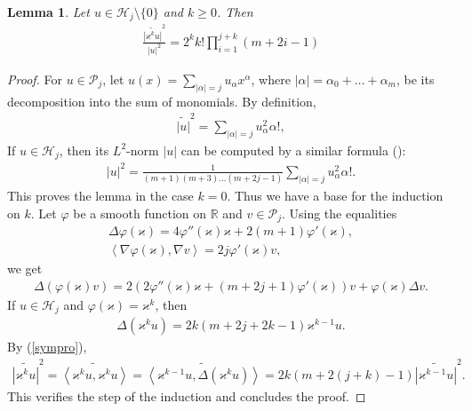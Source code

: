 \documentclass[10pt]{amsart}
\newtheorem{lemma}{Lemma}
\theoremstyle{remark}
\let\wtd=\widetilde
\begin{document}
\begin{lemma}\label{taukj}
Let $u\in{\mathcal{H}}_j\setminus\{0\}$ and $k\geq0$. Then
\begin{eqnarray*}
\frac{\wtd{|{{\mathord{\varkappa}}}^k u|}^2}{|u|^2}= 2^k
k!\prod_{i=1}^{j+k}(m+2i-1)
\end{eqnarray*}
\end{lemma}
\begin{proof}
For $u\in{\mathcal{P}}_j$, let $u(x)=\sum_{|{{\mathord{\alpha}}}|=j}u_{{\mathord{\alpha}}} x^{{\mathord{\alpha}}}$, where
$|{{\mathord{\alpha}}}|={{\mathord{\alpha}}}_0+\dots+{{\mathord{\alpha}}}_m$, be its decomposition into the sum of
monomials. By definition,
\begin{eqnarray}\label{kosnorm}
\wtd{|u|}^2=\sum_{|{{\mathord{\alpha}}}|=j}u_{{\mathord{\alpha}}}^2{{\mathord{\alpha}}}!,
\end{eqnarray}
If $u\in{\mathcal{H}}_j$, then its $L^2$-norm $|u|$ can be computed by a
similar formula (\cite[Theorem~5.14]{Ax01}):
\begin{eqnarray}\label{koltwo}
|u|^2=\frac1{(m+1)(m+3)\dots(m+2j-1)}\sum_{|{{\mathord{\alpha}}}|=j} u_{{\mathord{\alpha}}}^2{{\mathord{\alpha}}}!.
\end{eqnarray}
This proves the lemma in the case $k=0$. Thus we have a base for
the induction on $k$. Let ${{\mathord{\varphi}}}$ be a smooth function on ${\mathbb{R}}$ and
$v\in{\mathcal{P}}_j$. Using the equalities
\begin{eqnarray*}
{{\mathord{\Delta}}}{{\mathord{\varphi}}}({{\mathord{\varkappa}}})=4{{\mathord{\varphi}}}''({{\mathord{\varkappa}}}){{\mathord{\varkappa}}}+2(m+1){{\mathord{\varphi}}}'({{\mathord{\varkappa}}}),\\
{\left<{\nabla{{\mathord{\varphi}}}({{\mathord{\varkappa}}})},{\nabla v}\right>}=2j{{\mathord{\varphi}}}'({{\mathord{\varkappa}}})v,
\end{eqnarray*}
we get
\begin{eqnarray*}
{{\mathord{\Delta}}}({{\mathord{\varphi}}}({{\mathord{\varkappa}}})v)
=2(2{{\mathord{\varphi}}}''({{\mathord{\varkappa}}}){{\mathord{\varkappa}}}+(m+2j+1){{\mathord{\varphi}}}'({{\mathord{\varkappa}}}))v +{{\mathord{\varphi}}}({{\mathord{\varkappa}}}){{\mathord{\Delta}}} v.
\end{eqnarray*}
If $u\in{\mathcal{H}}_j$ and ${{\mathord{\varphi}}}({{\mathord{\varkappa}}})={{\mathord{\varkappa}}}^k$, then
\begin{eqnarray*}
{{\mathord{\Delta}}}({{\mathord{\varkappa}}}^k u)=2k\left(m+2j+2k-1\right){{\mathord{\varkappa}}}^{k-1}u.
\end{eqnarray*}
By (\ref{sympro}),
\begin{eqnarray*}
\wtd{|{{\mathord{\varkappa}}}^ku|}^2=\wtd{{\left<{{{\mathord{\varkappa}}}^k u},{{{\mathord{\varkappa}}}^k
u}\right>}}=\wtd{{\left<{{{\mathord{\varkappa}}}^{k-1}u},{{{\mathord{\Delta}}}({{\mathord{\varkappa}}}^k u)}\right>}}=
2k\left(m+2(j+k)-1\right)\wtd{|{{\mathord{\varkappa}}}^{k-1}u|}^2.
\end{eqnarray*}
This verifies the step of the induction and concludes the proof.
\end{proof}
\end{document}
